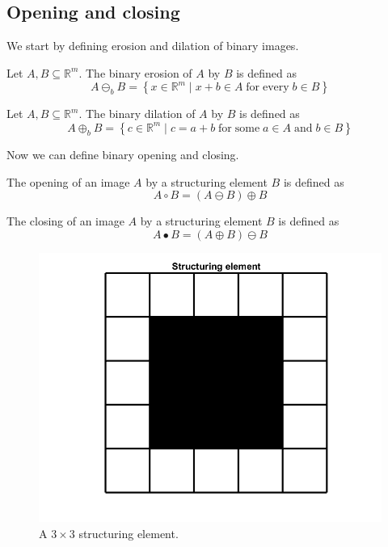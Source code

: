 \documentclass{beamer}
\begin{document}
\subsection{Opening and closing}

\begin{frame}
	We start by defining erosion and dilation of binary images.
	
	\begin{definition}
		Let $A, B \subseteq \mathbb{R}^m$. The binary erosion of $A$ by $B$ is defined as
		\begin{equation*}
			A \ominus_b B = \left\{ x \in \mathbb{R}^m \mid x + b \in A \; \mathrm{for \; every} \; b \in B \right\}
		\end{equation*}
	\end{definition}
	\begin{definition}
		Let $A, B \subseteq \mathbb{R}^m$. The binary dilation of $A$ by $B$ is defined as
		\begin{equation*}
			A \oplus_b B = \left\{ c \in \mathbb{R}^m \mid c = a + b \; \mathrm{for \; some} \; a \in A \; \mathrm{and} \; b \in B \right\}
		\end{equation*}
	\end{definition}
\end{frame}

\begin{frame}
	Now we can define binary opening and closing.
	
	\begin{definition}
		The opening of an image $A$ by a structuring element $B$ is defined as
		\begin{equation*}
			A \circ B = (A \ominus B) \oplus B
		\end{equation*}
	\end{definition}
	\begin{definition}
		The closing of an image $A$ by a structuring element $B$ is defined as
		\begin{equation*}
			A \bullet B = (A \oplus B) \ominus B
		\end{equation*}
	\end{definition}
\end{frame}

\begin{frame}
	\begin{figure}[h]
		\includegraphics[width=0.6\linewidth]{Morphology/StructuringElement}
		\caption[Structuring Element]{A $3 \times 3$ structuring element.}
		\label{fig:structuringelement}
	\end{figure}
\end{frame}
\end{document}
